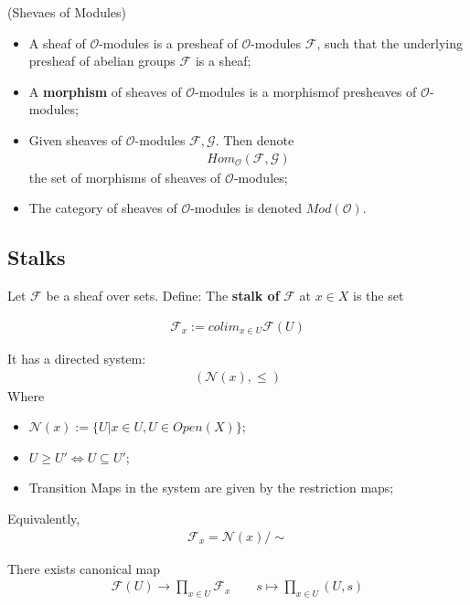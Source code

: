 \documentclass[Total.tex]{subfiles}
\begin{document}
				\begin{Def}
					(Shevaes of Modules) \label{Sheaves-Sheaves-Sheaves-of-Modules}
					\begin{itemize}
						\item A sheaf of $\mathcal{O}$-modules is a presheaf of $\mathcal{O}$-modules $\mathcal{F}$, such that the underlying presheaf of abelian groups $\mathcal{F}$ is a sheaf;
						\item A \textbf{morphism} of sheaves of $\mathcal{O}$-modules is a morphismof presheaves of $\mathcal{O}$-modules;
						\item Given sheaves of $\mathcal{O}$-modules $\mathcal{F},\mathcal{G}$. Then denote
						\begin{gather*}
							Hom_\mathcal{O}(\mathcal{F},\mathcal{G})
						\end{gather*}
						the set of morphisms of sheaves of $\mathcal{O}$-modules;
						
						\item The category of sheaves of $\mathcal{O}$-modules is denoted $Mod(\mathcal{O})$.
					\end{itemize}
				\end{Def}
				
				
			
			\subsection{Stalks}
			
				\begin{Def}
					Let $\mathcal{F}$ be a sheaf over sets. Define: The \textbf{stalk of} $\mathcal{F}$ at $x\in X$ is the set
					
					\begin{gather*}
						\mathcal{F}_x:=colim_{x\in U} \mathcal{F}(U) 
					\end{gather*} 
				\end{Def}
				It has a directed system:
				\begin{gather*}
					(\mathcal{N}(x),\leq)
				\end{gather*}
				Where
				\begin{itemize}
					\item $\mathcal{N}(x):=\{U|x\in U,U\in Open(X)\}$;
					\item $U\geq U'\Leftrightarrow U\subseteq U'$;
					\item Transition Maps in the system are given by the restriction maps;
				\end{itemize}
				Equivalently,
				\begin{gather*}
					\mathcal{F}_x=\mathcal{N}(x)/\sim
				\end{gather*}
				\begin{Def}
					There exists canonical map
					\begin{gather*}
						\mathcal{F}(U)\rightarrow \prod_{x\in U} \mathcal{F}_x\qquad s\mapsto \prod_{x\in U} (U,s)
					\end{gather*}
				\end{Def}
\end{document}
